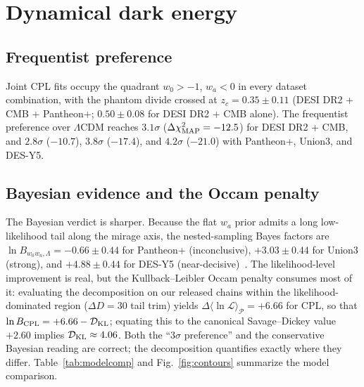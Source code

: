 \documentclass[aps,prd,twocolumn,superscriptaddress,nofootinbib]{revtex4-2}
\begin{document}
\section{Dynamical dark energy}
\label{sec:dde}

\subsection{Frequentist preference}

Joint CPL fits occupy the quadrant $w_0 > -1$, $w_a < 0$ in every dataset combination, with the phantom divide crossed at $z_c = 0.35 \pm 0.11$ (DESI DR2 + CMB + Pantheon+; $0.50 \pm 0.08$ for DESI DR2 + CMB alone). The frequentist preference over $\Lambda$CDM reaches $3.1\sigma$ ($\Delta\chi^2_{\rm MAP} = -12.5$) for DESI DR2 + CMB, and $2.8\sigma$ ($-10.7$), $3.8\sigma$ ($-17.4$), and $4.2\sigma$ ($-21.0$) with Pantheon+, Union3, and DES-Y5.

\subsection{Bayesian evidence and the Occam penalty}

The Bayesian verdict is sharper. Because the flat $w_a$ prior admits a long low-likelihood tail along the mirage axis, the nested-sampling Bayes factors are $\ln B_{w_0w_a,\Lambda} = -0.66 \pm 0.44$ for Pantheon+ (inconclusive), $+3.03 \pm 0.44$ for Union3 (strong), and $+4.88 \pm 0.44$ for DES-Y5 (near-decisive)~\cite{Lodha2025}. The likelihood-level improvement is real, but the Kullback--Leibler Occam penalty consumes most of it: evaluating the decomposition on our released chains within the likelihood-dominated region ($\Delta D = 30$ tail trim) yields $\Delta\langle\ln\mathcal{L}\rangle_{\mathcal{P}} = +6.66$ for CPL, so that $\ln B_{\rm CPL} = +6.66 - \mathcal{D}_{\rm KL}$; equating this to the canonical Savage--Dickey value $+2.60$ implies $\mathcal{D}_{\rm KL} \approx 4.06$. Both the ``$3\sigma$ preference'' and the conservative Bayesian reading are correct; the decomposition quantifies exactly where they differ. Table~\ref{tab:modelcomp} and Fig.~\ref{fig:contours} summarize the model comparison.
\end{document}
